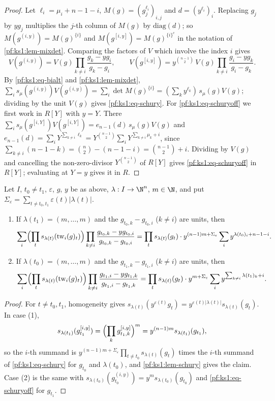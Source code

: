 \begin{proof}
Let $\ell_i=\mu_i+n-1-i$, $M(g)=(g_j^{\ell_i})_{i,j}$ and $d=(y^{\ell_i})_i$. Replacing $g_j$ by $yg_j$ multiplies the $j$-th column of
$M(g)$ by $\mathrm{diag}(d)$; so $M(g^{(i,y)})=M(g)^{\{i\}}$ and $M(g^{[i,y]})=M(g)^{\{i\}^c}$ in the notation of
\cref{pf:ks1:lem-mixdet}. Comparing the factors of $V$ which involve the index $i$ gives
\[V(g^{(i,y)})=V(g)\prod_{k\neq i}\frac{g_k-yg_i}{g_k-g_i},\qquad
V(g^{[i,y]})=y^{\binom{n-1}2}\,V(g)\prod_{k\neq i}\frac{g_i-yg_k}{g_i-g_k}.\] By \eqref{pf:ks1:eq-bialt} and \cref{pf:ks1:lem-mixdet},
$\sum_is_\mu(g^{(i,y)})V(g^{(i,y)})=\sum_i\det M(g)^{\{i\}}=(\sum_ky^{\ell_k})\,s_\mu(g)V(g)$; dividing by the unit $V(g)$ gives
\eqref{pf:ks1:eq-schury}. For \eqref{pf:ks1:eq-schuryoff} we first work in $R[Y]$ with $y=Y$. There
$\sum_is_\mu(g^{[i,Y]})V(g^{[i,Y]})=e_{n-1}(d)\,s_\mu(g)V(g)$ and
$e_{n-1}(d)=\sum_iY^{\sum_{k\neq i}\ell_k}=Y^{\binom{n-1}2}\sum_iY^{\sum_{k\neq i}\mu_k+i}$, since
$\sum_{k\neq i}(n-1-k)=\binom n2-(n-1-i)=\binom{n-1}2+i$. Dividing by $V(g)$ and cancelling the non-zero-divisor
$Y^{\binom{n-1}2}$ of $R[Y]$ gives \eqref{pf:ks1:eq-schuryoff} in $R[Y]$; evaluating at $Y=y$ gives it in $R$.
\end{proof}

\begin{lemma}\label{pf:ks1:lem-fibre}
Let $I$, $t_0\neq t_1$, $\varepsilon$, $g$, $y$ be as above, $\lambda:I\to\N^n$, $m\in\N$, and put
$\Sigma_\varepsilon=\sum_{t\neq t_0,t_1}\varepsilon(t)|\lambda(t)|$.
\begin{enumerate}
\item If $\lambda(t_1)=(m,\dots,m)$ and the $g_{t_0,k}-g_{t_0,i}$ ($k\neq i$) are units, then
\[\sum_i\Bigl(\prod_ts_{\lambda(t)}(\mathrm{tw}_i(g)_t)\Bigr)\prod_{k\neq i}\frac{g_{t_0,k}-yg_{t_0,i}}{g_{t_0,k}-g_{t_0,i}}
=\prod_ts_{\lambda(t)}(g_t)\cdot y^{(n-1)m+\Sigma_\varepsilon}\sum_iy^{\lambda(t_0)_i+n-1-i}.\]
\item If $\lambda(t_0)=(m,\dots,m)$ and the $g_{t_1,k}-g_{t_1,i}$ ($k\neq i$) are units, then
\[\sum_i\Bigl(\prod_ts_{\lambda(t)}(\mathrm{tw}_i(g)_t)\Bigr)\prod_{k\neq i}\frac{g_{t_1,i}-yg_{t_1,k}}{g_{t_1,i}-g_{t_1,k}}
=\prod_ts_{\lambda(t)}(g_t)\cdot y^{m+\Sigma_\varepsilon}\sum_iy^{\sum_{k\neq i}\lambda(t_1)_k+i}.\]
\end{enumerate}
\end{lemma}

\begin{proof}
For $t\neq t_0,t_1$, homogeneity gives $s_{\lambda(t)}(y^{\varepsilon(t)}g_t)=y^{\varepsilon(t)|\lambda(t)|}s_{\lambda(t)}(g_t)$. In case (1),
\[s_{\lambda(t_1)}(g_{t_1}^{[i,y]})=\Bigl(\prod_kg^{[i,y]}_{t_1,k}\Bigr)^m=y^{(n-1)m}s_{\lambda(t_1)}(g_{t_1}),\]
so the $i$-th summand is $y^{(n-1)m+\Sigma_\varepsilon}\prod_{t\neq t_0}s_{\lambda(t)}(g_t)$ times the $i$-th summand of
\eqref{pf:ks1:eq-schury} for $g_{t_0}$ and $\lambda(t_0)$, and \cref{pf:ks1:lem-schury} gives the claim. Case (2) is the same with
$s_{\lambda(t_0)}(g_{t_0}^{(i,y)})=y^ms_{\lambda(t_0)}(g_{t_0})$ and \eqref{pf:ks1:eq-schuryoff} for $g_{t_1}$.
\end{proof}

